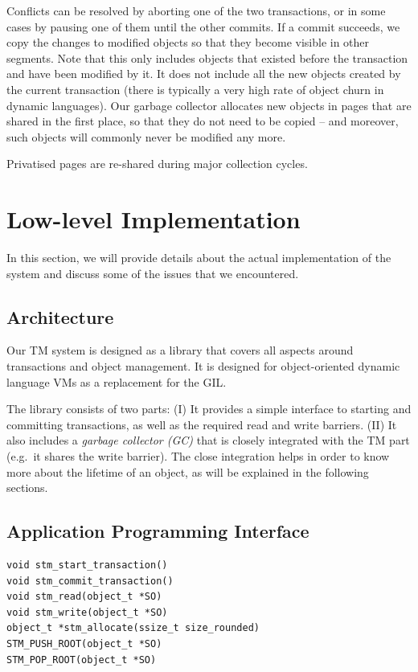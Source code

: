 \documentclass{sigplanconf}
\begin{document}
Conflicts can be resolved by aborting one of the two transactions, or in
some cases by pausing one of them until the other commits.  If a commit
succeeds, we copy the changes to modified objects so that they become
visible in other segments.  Note that this only includes objects that
existed before the transaction and have been modified by it.  It does
not include all the new objects created by the current transaction
(there is typically a very high rate of object churn in dynamic languages).
Our garbage collector allocates new objects in pages that are shared in
the first place, so that they do not need to be copied -- and moreover,
such objects will commonly never be modified any more.

Privatised pages are re-shared during major collection cycles.



\section{Low-level Implementation\label{sub:Low-level-Implementation}}

In this section, we will provide details about the actual
implementation of the system and discuss some of the issues that we
encountered.


\subsection{Architecture}

Our TM system is designed as a library that covers all aspects around
transactions and object management. It is designed for object-oriented
dynamic language VMs as a replacement for the GIL.

The library consists of two parts: (I) It provides a simple interface
to starting and committing transactions, as well as the required read
and write barriers. (II) It also includes a \emph{garbage collector
(GC)} that is closely integrated with the TM part (e.g.\ it shares the
write barrier). The close integration helps in order to know more
about the lifetime of an object, as will be explained in the following
sections.


\subsection{Application Programming Interface\label{sub:Application-Programming-Interfac}}

\begin{lstlisting}
void stm_start_transaction()
void stm_commit_transaction()
void stm_read(object_t *SO)
void stm_write(object_t *SO)
object_t *stm_allocate(ssize_t size_rounded)
STM_PUSH_ROOT(object_t *SO)
STM_POP_ROOT(object_t *SO)
\end{lstlisting}
\end{document}
